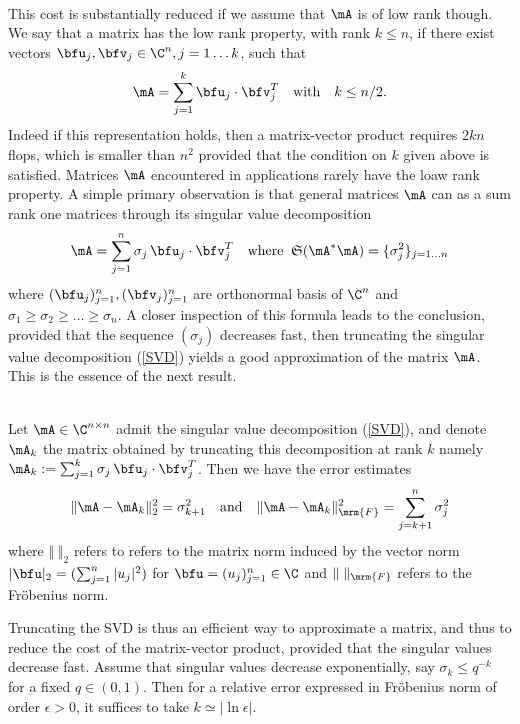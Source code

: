 \quad\\
This cost is substantially reduced if we assume that $\mA$ is of low rank though. We say that a matrix has the low rank property, 
with rank $k\leq n$, if there exist vectors $\bfu_{j},\bfv_{j}\in \C^{n}, j=1\dots k$, such that 
$$
\mA = \sum_{j=1}^{k}\bfu_{j}\cdot\bfv_{j}^{T}\quad \textrm{with}\quad k\leq n/2.
$$ 
Indeed if this representation holds, then a matrix-vector product requires $2 k n$ flops, which is smaller than $n^{2}$ provided 
that the condition on $k$ given above is satisfied. Matrices $\mA$ encountered in applications rarely have the loaw rank property. 
A simple primary observation is that general matrices $\mA$ can as a sum rank one matrices through its singular value
decomposition
\begin{equation}\label{SVD}
\mA = \sum_{j=1}^{n}\sigma_{j}\,\bfu_{j}\cdot\bfv_{j}^{T}\quad \textrm{where}\;\; \mathfrak{S}(\mA^{*}\mA) = \{\sigma_{j}^{2}\}_{j=1\dots n}
\end{equation}
where $(\bfu_{j})_{j=1}^{n}, (\bfv_{j})_{j=1}^{n}$ are orthonormal basis of $\C^{n}$ and $\sigma_{1}\geq \sigma_{2}\geq \dots \geq \sigma_{n}$. 
A closer inspection of this formula leads to the conclusion, provided that the sequence $(\sigma_{j})$  decreases fast, then 
truncating the singular value decomposition (\ref{SVD}) yields a good approximation of the matrix $\mA$. This is the essence of 
the next result.

\begin{proposition}\quad\\
Let $\mA\in \C^{n\times n}$ admit the singular value decomposition (\ref{SVD}), and denote $\mA_{k}$ the 
matrix obtained by truncating this decomposition at rank $k$ namely $\mA_{k}:=\sum_{j=1}^{k}\sigma_{j}\,\bfu_{j}
\cdot\bfv_{j}^{T}$. Then we have the error estimates
$$
\Vert \mA - \mA_{k}\Vert_{2}^{2} = \sigma_{k+1}^{2}
\quad\textrm{and}\quad 
\Vert \mA - \mA_{k}\Vert_{\mrm{F}}^{2} = \sum_{j=k+1}^{n}\sigma_{j}^{2}
$$
where $\Vert \;\Vert_{2}$ refers to refers to the matrix norm induced by the vector norm $\vert \bfu\vert_{2} = (\sum_{j=1}^{n}\vert u_{j}\vert^{2})$ 
for $\bfu = (u_{j})_{j=1}^{n}\in \C$ and $\Vert \;\Vert_{\mrm{F}}$ refers to the Fr\"obenius norm.
\end{proposition}

\noindent 
Truncating the SVD is thus an efficient way to approximate a matrix, and thus to reduce the cost of the 
matrix-vector product, provided that  the singular values decrease fast. Assume that singular values decrease 
exponentially, say $\sigma_{k}\leq q^{-k}$ for a fixed $q\in (0,1)$. Then for a relative error expressed in Fr\"obenius norm of order $\epsilon>0$,  
it suffices to take $k \simeq \vert\ln \epsilon\vert$. 

